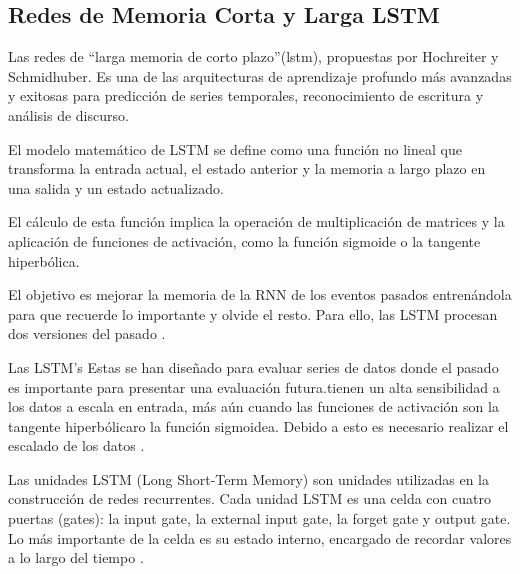  
\subsection{Redes de Memoria Corta y Larga  LSTM}

Las redes de “larga memoria de corto plazo”(\gls{lstm}), propuestas por Hochreiter y Schmidhuber. Es una de las arquitecturas de aprendizaje profundo más avanzadas y exitosas para predicción de series temporales, reconocimiento de escritura y análisis de discurso\cite{fernandez2021estimacion}.

El modelo matemático de LSTM se define como una función no lineal que transforma la entrada actual, el estado anterior y la memoria a largo plazo en una salida y un estado actualizado.

El cálculo de esta función implica la  operación  de  multiplicación  de  matrices  y  la  aplicación  de  funciones  de  activación,  como la función sigmoide o la tangente hiperbólica\cite{tomas2023prediccion}.

El objetivo es mejorar la memoria de la RNN de los eventos pasados entrenándola para que recuerde lo importante y olvide el resto. Para ello, las LSTM procesan dos versiones del pasado \cite{arana2021redes}.

Las LSTM's Estas se han diseñado para evaluar series de datos donde el pasado es importante para presentar una evaluación futura.tienen un alta sensibilidad a los datos a escala
en entrada, más aún cuando las funciones de activación son la
tangente hiperbólicaro la función sigmoidea. Debido a esto es
necesario realizar el escalado de los datos \cite{escobar2022evaluacion}.

\vspace{1\baselineskip}
Las unidades LSTM (Long Short-Term Memory) son unidades utilizadas en la construcción de redes recurrentes. Cada unidad LSTM es una celda con cuatro puertas (gates): la input gate, la external input gate, la forget gate y output gate. Lo más importante de la celda es su estado interno, encargado de recordar valores a lo largo del tiempo \cite{roman2018redes}.

